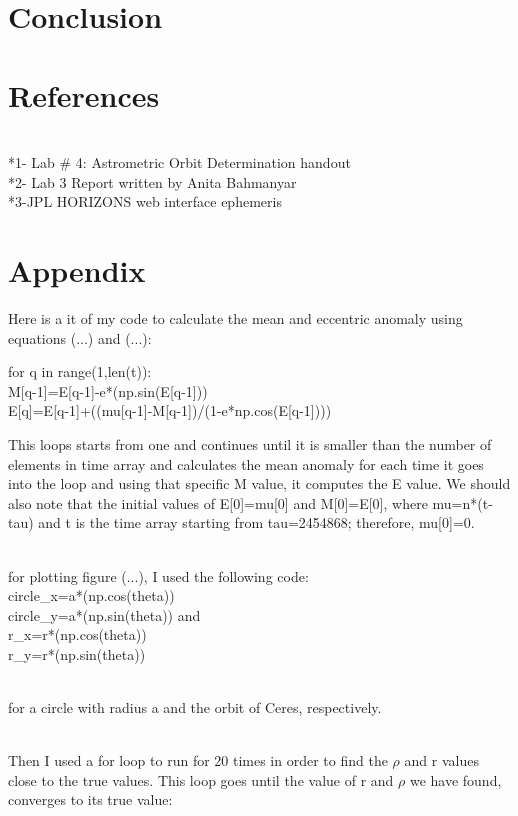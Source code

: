 \documentclass[letterpaper,12pt]{article}
\begin{document}
\section{Conclusion}
\label{sec:conclusion}


\section{References}
\label{sec:references}
\\*1- Lab # 4: Astrometric Orbit Determination handout
\\*2- Lab 3 Report written by Anita Bahmanyar
\\*3-JPL HORIZONS web interface ephemeris

\section{Appendix}
\label{sec:appendix}
Here is a it of my code to calculate the mean and eccentric anomaly using equations (...) and  (...):

for q in range(1,len(t)):
\\       M[q-1]=E[q-1]-e*(np.sin(E[q-1]))
\\       E[q]=E[q-1]+((mu[q-1]-M[q-1])/(1-e*np.cos(E[q-1]))) 
   
This loops starts from one and continues until it is smaller than the number of elements in time array and calculates the mean anomaly for each time it goes into the loop and using that specific M value, it computes the E value. We should also note that the initial values of E[0]=mu[0] and M[0]=E[0], where mu=n*(t-tau) and t is the time array starting from tau=2454868; therefore, mu[0]=0.
    

\\for plotting figure (...), I used the following code:
\\circle_x=a*(np.cos(theta))
\\circle_y=a*(np.sin(theta))
 and 
\\r_x=r*(np.cos(theta))
\\r_y=r*(np.sin(theta))
 
\\for a circle with radius a and the orbit of Ceres, respectively.

\\Then I used a for loop to run for 20 times in order to find the \begin{math} \rho \end{math} and r values close to the true values. This loop goes until the value of r and \begin{math} \rho \end{math} we have found, converges to its true value:
\end{document}
